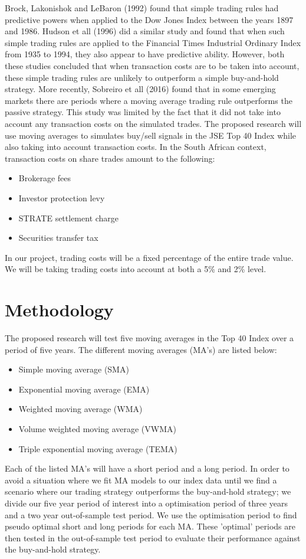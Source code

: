\documentclass[12pt]{article}
\begin{document}
Brock, Lakonishok and LeBaron (1992) found that simple trading rules had predictive powers when applied to the Dow Jones Index between the years 1897 and 1986. Hudson et all (1996) did a similar study and found that when such simple trading rules are applied to the Financial Times Industrial Ordinary Index from 1935 to 1994, they also appear to have predictive ability. However, both these studies concluded that when transaction costs are to be taken into account, these simple trading rules are unlikely to outperform a simple buy-and-hold strategy. More recently, Sobreiro et all (2016) found that in some emerging markets there are periods where a moving average trading rule outperforms the passive strategy. This study was limited by the fact that it did not take into account any transaction costs on the simulated trades. The proposed research will use moving averages to simulates buy/sell signals in the JSE Top 40 Index while also taking into account transaction costs. In the South African context, transaction costs on share trades amount to the following:
\begin{itemize}
\item Brokerage fees
\item Investor protection levy
\item STRATE settlement charge
\item Securities transfer tax
\end{itemize} 
In our project, trading costs will be a fixed percentage of the entire trade value. We will be taking trading costs into account at both a 5\% and 2\% level. 

\section{Methodology}
\label{sec:meth}

The proposed research will test five moving averages in the Top 40 Index over a period of five years. The different moving averages (MA's) are listed below:

\begin{itemize}
\item Simple moving average (SMA)
\item Exponential moving average (EMA)
\item Weighted moving average (WMA)
\item Volume weighted moving average (VWMA)
\item Triple exponential moving average (TEMA)
\end{itemize} 
Each of the listed MA's will have a short period and a long period. In order to avoid a situation where we fit MA models to our index data until we find a scenario where our trading strategy outperforms the buy-and-hold strategy; we divide our five year period of interest into a optimisation period of three years and a two year out-of-sample test period. We use the optimisation period to find pseudo optimal short and long periods for each MA. These 'optimal' periods are then tested in the out-of-sample test period to evaluate their performance against the buy-and-hold strategy.
\end{document}
